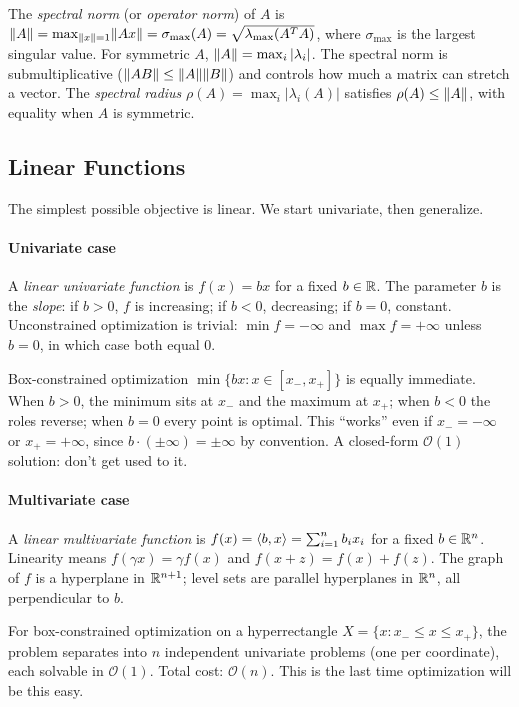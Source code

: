The \emph{spectral norm} (or \emph{operator norm}) of $A$ is
$\lVert A\rVert = \max_{\lVert x\rVert=1} \lVert Ax\rVert = \sigma_{\max}(A) = \sqrt{\lambda_{\max}(A^T A)}$,
where $\sigma_{\max}$ is the largest singular value.
For symmetric $A$, $\lVert A\rVert = \max_i |\lambda_i|$.
The spectral norm is submultiplicative ($\lVert AB\rVert \leq \lVert A\rVert\lVert B\rVert$) and controls how much a matrix can stretch a vector.
The \emph{spectral radius} $\rho(A) = \max_i |\lambda_i(A)|$ satisfies $\rho(A) \leq \lVert A\rVert$, with equality when $A$ is symmetric.


\subsection{Linear Functions}\label{sec:linear-functions}

The simplest possible objective is linear.
We start univariate, then generalize.

\paragraph{Univariate case}

A \emph{linear univariate function} is $f(x) = bx$ for a fixed $b \in \mathbb{R}$.
The parameter $b$ is the \emph{slope}: if $b > 0$, $f$ is increasing; if $b < 0$, decreasing; if $b = 0$, constant.
Unconstrained optimization is trivial: $\min f = -\infty$ and $\max f = +\infty$ unless $b = 0$, in which case both equal $0$.

Box-constrained optimization $\min\{bx : x \in [x_-, x_+]\}$ is equally immediate.
When $b > 0$, the minimum sits at $x_-$ and the maximum at $x_+$; when $b < 0$ the roles reverse; when $b = 0$ every point is optimal.
This ``works'' even if $x_- = -\infty$ or $x_+ = +\infty$, since $b \cdot (\pm \infty) = \pm \infty$ by convention.
A closed-form $\mathcal{O}(1)$ solution: don't get used to it.

\paragraph{Multivariate case}

A \emph{linear multivariate function} is $f(x) = \langle b, x\rangle = \sum_{i=1}^{n} b_i x_i$ for a fixed $b \in \mathbb{R}^n$.
Linearity means $f(\gamma x) = \gamma f(x)$ and $f(x + z) = f(x) + f(z)$.
The graph of $f$ is a hyperplane in $\mathbb{R}^{n+1}$; level sets are parallel hyperplanes in $\mathbb{R}^n$, all perpendicular to $b$.

For box-constrained optimization on a hyperrectangle $X = \{x : x_- \leq x \leq x_+\}$, the problem separates into $n$ independent univariate problems (one per coordinate), each solvable in $\mathcal{O}(1)$.
Total cost: $\mathcal{O}(n)$.
This is the last time optimization will be this easy.


